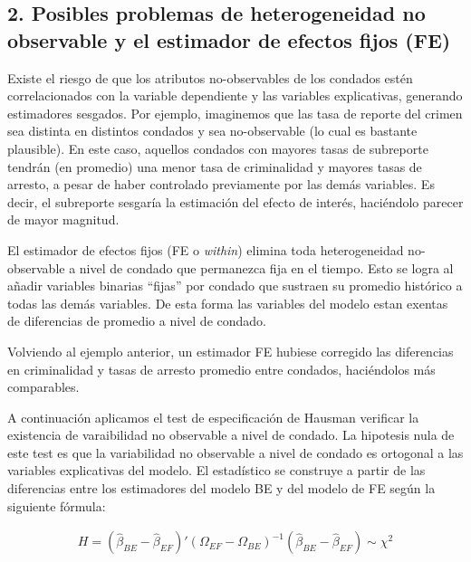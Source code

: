 \documentclass[
]{article}
\begin{document}
\hypertarget{posibles-problemas-de-heterogeneidad-no-observable-y-el-estimador-de-efectos-fijos-fe}{%
\subsection{2. Posibles problemas de heterogeneidad no observable y el
estimador de efectos fijos
(FE)}\label{posibles-problemas-de-heterogeneidad-no-observable-y-el-estimador-de-efectos-fijos-fe}}

Existe el riesgo de que los atributos no-observables de los condados
estén correlacionados con la variable dependiente y las variables
explicativas, generando estimadores sesgados. Por ejemplo, imaginemos
que las tasa de reporte del crimen sea distinta en distintos condados y
sea no-observable (lo cual es bastante plausible). En este caso,
aquellos condados con mayores tasas de subreporte tendrán (en promedio)
una menor tasa de criminalidad y mayores tasas de arresto, a pesar de
haber controlado previamente por las demás variables. Es decir, el
subreporte sesgaría la estimación del efecto de interés, haciéndolo
parecer de mayor magnitud.

El estimador de efectos fijos (FE o \emph{within}) elimina toda
heterogeneidad no-observable a nivel de condado que permanezca fija en
el tiempo. Esto se logra al añadir variables binarias ``fijas'' por
condado que sustraen su promedio histórico a todas las demás variables.
De esta forma las variables del modelo estan exentas de diferencias de
promedio a nivel de condado.

Volviendo al ejemplo anterior, un estimador FE hubiese corregido las
diferencias en criminalidad y tasas de arresto promedio entre condados,
haciéndolos más comparables.

A continuación aplicamos el test de especificación de Hausman verificar
la existencia de varaibilidad no observable a nivel de condado. La
hipotesis nula de este test es que la variabilidad no observable a nivel
de condado es ortogonal a las variables explicativas del modelo. El
estadístico se construye a partir de las diferencias entre los
estimadores del modelo BE y del modelo de FE según la siguiente fórmula:

\begin{gather*}
H = ( \hat \beta_{BE} - \hat \beta_{EF})' (\Omega_{EF}-\Omega_{BE})^{-1}  ( \hat \beta_{BE} - \hat \beta_{EF}) \sim \chi^2
\end{gather*}
\end{document}

